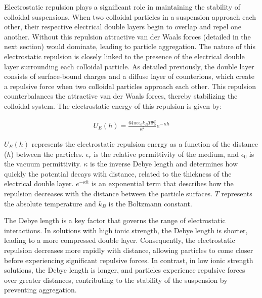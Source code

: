 Electrostatic repulsion plays a significant role in maintaining the stability of colloidal suspensions. When two colloidal particles in a suspension approach each other, their respective electrical double layers begin to overlap and repel one another. Without this repulsion attractive van der Waals forces (detailed in the next section) would dominate, leading to particle aggregation. The nature of this electrostatic repulsion is closely linked to the presence of the electrical double layer surrounding each colloidal particle. As detailed previously, the double layer consists of surface-bound charges and a diffuse layer of counterions, which create a repulsive force when two colloidal particles approach each other. This repulsion counterbalances the attractive van der Waals forces, thereby stabilizing the colloidal system.\cite{hunter1989foundations} The electrostatic energy of this repulsion is given by:


\begin{equation} %
\begin{split}
U_E(h)= \frac{64 \pi \epsilon \epsilon_0 k_BT \Psi_0^2}{\kappa^2} e^{-\kappa h}
\end{split}
\end{equation}

\( U_E(h) \) represents the electrostatic repulsion energy as a function of the distance (\( h \)) between the particles. \( \epsilon_r \) is the relative permittivity of the medium, and \( \epsilon_0 \) is the vacuum permittivity. \( \kappa \) is the inverse Debye length and determines how quickly the potential decays with distance, related to the thickness of the electrical double layer. \( e^{-\kappa h} \) is an exponential term that describes how the repulsion decreases with the distance between the particle surfaces. $T$ represents the absolute temperature and $k_B$ is the Boltzmann constant. \cite{OHSHIMA200218} \cite{behrens2001charge}

The Debye length is a key factor that governs the range of electrostatic interactions. In solutions with high ionic strength, the Debye length is shorter, leading to a more compressed double layer. Consequently, the electrostatic repulsion decreases more rapidly with distance, allowing particles to come closer before experiencing significant repulsive forces. In contrast, in low ionic strength solutions, the Debye length is longer, and particles experience repulsive forces over greater distances, contributing to the stability of the suspension by preventing aggregation.

